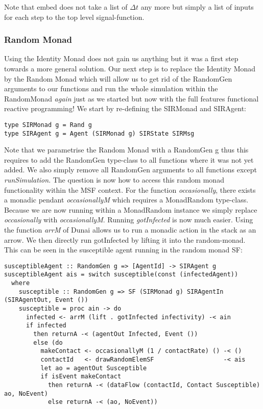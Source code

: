 Note that embed does not take a list of $\Delta t$ any more but simply a list of inputs for each step to the top level signal-function.

\subsubsection{Random Monad}
Using the Identity Monad does not gain us anything but it was a first step towards a more general solution. Our next step is to replace the Identity Monad by the Random Monad which will allow us to get rid of the RandomGen arguments to our functions and run the whole simulation within the RandomMonad \textit{again} just as we started but now with the full features functional reactive programming!
We start by re-defining the SIRMonad and SIRAgent:

\begin{verbatim}
type SIRMonad g = Rand g
type SIRAgent g = Agent (SIRMonad g) SIRState SIRMsg
\end{verbatim}

Note that we parametrise the Random Monad with a RandomGen g thus this requires to add the RandomGen type-class to all functions where it was not yet added. We also simply remove all RandomGen arguments to all functions except \textit{runSimulation}. The question is now how to access this random monad functionality within the MSF context.
For the function \textit{occasionally}, there exists a monadic pendant \textit{occasionallyM} which requires a MonadRandom type-class. Because we are now running within a MonadRandom instance we simply replace \textit{occasionally} with \textit{occasionallyM}.
Running \textit{gotInfected} is now much easier. Using the function \textit{arrM} of Dunai allows us to run a monadic action in the stack as an arrow. We then directly run gotInfected by lifting it into the random-monad.
This can be seen in the susceptible agent running in the random monad SF:
\begin{verbatim}
susceptibleAgent :: RandomGen g => [AgentId] -> SIRAgent g
susceptibleAgent ais = switch susceptible(const (infectedAgent))
  where
    susceptible :: RandomGen g => SF (SIRMonad g) SIRAgentIn (SIRAgentOut, Event ())
    susceptible = proc ain -> do
      infected <- arrM (lift . gotInfected infectivity) -< ain
      if infected 
        then returnA -< (agentOut Infected, Event ())
        else (do
          makeContact <- occasionallyM (1 / contactRate) () -< ()
          contactId   <- drawRandomElemSF                   -< ais
          let ao = agentOut Susceptible
          if isEvent makeContact
            then returnA -< (dataFlow (contactId, Contact Susceptible) ao, NoEvent)
            else returnA -< (ao, NoEvent))
\end{verbatim}

